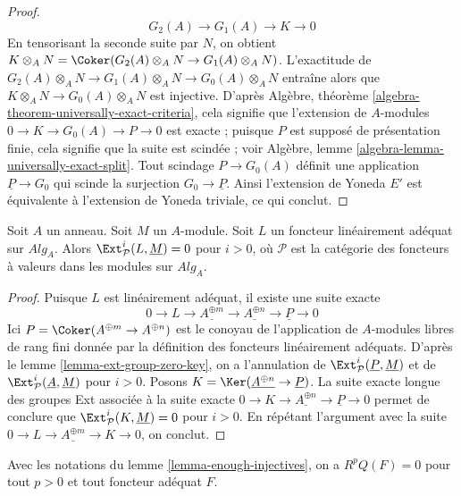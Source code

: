 \begin{proof}
$$G_2(A) \to G_1(A) \to K \to 0
$$
En tensorisant la seconde suite par $N$, on obtient
$K \otimes_A N = \Coker(G_2(A) \otimes_A N \to G_1(A) \otimes_A N)$.
L'exactitude de $G_2(A) \otimes_A N \to G_1(A) \otimes_A N \to G_0(A) \otimes_A N$
entraîne alors que $K \otimes_A N \to G_0(A) \otimes_A N$ est injective.
D'après
Algèbre, théorème \ref{algebra-theorem-universally-exact-criteria},
cela signifie que l'extension de $A$-modules $0 \to K \to G_0(A) \to P \to 0$
est exacte ; puisque $P$ est supposé de présentation finie, cela signifie
que la suite est scindée ; voir
Algèbre, lemme \ref{algebra-lemma-universally-exact-split}.
Tout scindage $P \to G_0(A)$ définit une application $\underline{P} \to G_0$
qui scinde la surjection $G_0 \to \underline{P}$. Ainsi
l'extension de Yoneda $E'$ est équivalente à l'extension de Yoneda triviale,
ce qui conclut.
\end{proof}

\begin{lemma}
\label{lemma-ext-group-zero}
Soit $A$ un anneau. Soit $M$ un $A$-module. Soit $L$ un foncteur linéairement
adéquat sur $\textit{Alg}_A$. Alors
$\Ext^i_\mathcal{P}(L, \underline{M}) = 0$
pour $i > 0$, où $\mathcal{P}$ est la catégorie des foncteurs à valeurs dans les modules
sur $\textit{Alg}_A$.
\end{lemma}

\begin{proof}
Puisque $L$ est linéairement adéquat, il existe une suite exacte
$$
0 \to L \to \underline{A^{\oplus m}} \to \underline{A^{\oplus n}} \to
\underline{P} \to 0
$$
Ici $P = \Coker(A^{\oplus m} \to A^{\oplus n})$ est le conoyau
de l'application de $A$-modules libres de rang fini donnée par la définition
des foncteurs linéairement adéquats. D'après le
lemme \ref{lemma-ext-group-zero-key},
on a l'annulation de
$\Ext^i_\mathcal{P}(\underline{P}, \underline{M})$
et de
$\Ext^i_\mathcal{P}(\underline{A}, \underline{M})$
pour $i > 0$.
Posons $K = \Ker(\underline{A^{\oplus n}} \to \underline{P})$.
La suite exacte longue des groupes Ext associée à la suite exacte
$0 \to K \to \underline{A^{\oplus n}} \to \underline{P} \to 0$
permet de conclure que
$\Ext^i_\mathcal{P}(K, \underline{M}) = 0$ pour $i > 0$.
En répétant l'argument avec la suite
$0 \to L \to \underline{A^{\oplus m}} \to K \to 0$,
on conclut.
\end{proof}

\begin{lemma}
\label{lemma-RQ-zero}
Avec les notations du
lemme \ref{lemma-enough-injectives},
on a $R^pQ(F) = 0$ pour tout $p > 0$ et tout foncteur adéquat $F$.
\end{lemma}

